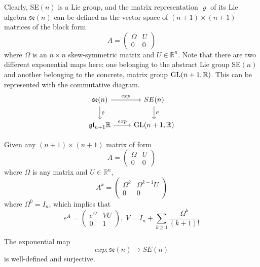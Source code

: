     Clearly, SE$(n)$ is a Lie group, and the matrix representation $\varrho$ of its Lie algebra $\mathfrak{se}(n)$ can be defined as the vector space of $(n+1) \times (n+1)$ matrices of the block form 
    \begin{equation}
      A = \begin{pmatrix}
      \Omega & U \\0 & 0
      \end{pmatrix}
    \end{equation}
    where $\Omega$ is an $n \times n$ skew-symmetric matrix and $U \in \mathbb{R}^n$. Note that there are two different exponential maps here: one belonging to the abstract Lie group SE$(n)$ and another belonging to the concrete, matrix group $\operatorname{GL}(n+1, \mathbb{R})$. This can be represented with the commutative diagram. 
    \[\begin{tikzcd}
    \mathfrak{se}(n) \arrow{r}{exp} \arrow{d}{\varrho} & SE(n) \arrow{d} {\rho}\\
    \mathfrak{gl}_{n+1} \mathbb{R} \arrow{r}{exp} & \GL(n+1, \mathbb{R})
    \end{tikzcd}\]

    \begin{lemma}
      Given any $(n+1) \times (n+1)$ matrix of form 
      \begin{equation}
        A = \begin{pmatrix}
         \Omega & U \\0&0
        \end{pmatrix}
      \end{equation}
      where $\Omega$ is any matrix and $U \in \mathbb{R}^n$, 
      \begin{equation}
        A^k = \begin{pmatrix}
        \Omega^k & \Omega^{k-1} U \\0&0
        \end{pmatrix}
      \end{equation}
      where $\Omega^0 = I_n$, which implies that
      \begin{equation}
        e^A = \begin{pmatrix}
        e^\Omega & V U \\ 0 & 1
        \end{pmatrix}, \; V = I_n + \sum_{k \geq 1} \frac{\Omega^k}{(k+1)!}
      \end{equation}
    \end{lemma}

    \begin{theorem}
      The exponential map
      \begin{equation}
        exp: \mathfrak{se}(n) \rightarrow SE(n)
      \end{equation}
      is well-defined and surjective. 
    \end{theorem}

